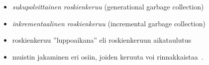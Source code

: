 
\begin{itemize}
\item \textit{sukupolvittainen roskienkeruu} (generational garbage collection)~\cite{v8design}
\item \textit{inkrementaalinen roskienkeruu} (incremental garbage collection)~\cite{incrementalgc}
\item roskienkeruu ''luppoaikana'' eli roskienkeruun aikataulutus~\cite{freegc}
\item muistin jakaminen eri osiin, joiden keruuta voi rinnakkaistaa~\cite{ie10}.
\end{itemize}
